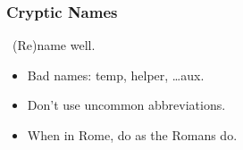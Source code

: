 \begin{frame}

\frametitle{Cryptic Names}

\begin{center}

\leftthumbsup~(Re)name well.~\rightthumbsup

\end{center}

\vspace{\fill}

\begin{itemize}

\item Bad names: temp, helper, \ldots aux.

\item Don't use uncommon abbreviations.

\item When in Rome, do as the Romans do.

\end{itemize}

\end{frame}
